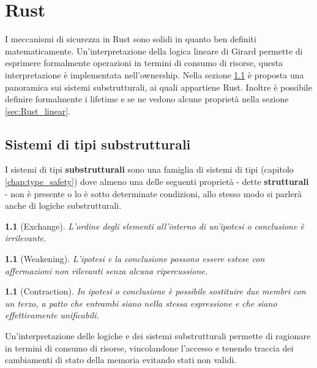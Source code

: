 \documentclass[Lau,binding=0.6cm]{sapthesis}
\newtheorem{lemma}[theorem]{}
\begin{document}




\chapter{Rust} \label{chap:Rust}
I meccanismi di sicurezza in Rust sono solidi in quanto ben definiti matematicamente.
Un'interpretazione della logica lineare di Girard permette di esprimere formalmente operazioni in termini di consumo di risorse, questa interpretazione è implementata nell'ownership.
Nella sezione \ref{sec:Rust_substruct} è proposta una panoramica sui sistemi substrutturali, ai quali appartiene Rust. 
Inoltre è possibile definire formalmente i lifetime e se ne vedono alcune proprietà nella sezione \ref{sec:Rust_linear}.

\section{Sistemi di tipi substrutturali} \label{sec:Rust_substruct}
I sistemi di tipi \textbf{substrutturali} sono una famiglia di sistemi di tipi (capitolo \ref{chap:type_safety}) dove almeno una delle seguenti proprietà - dette \textbf{strutturali} - non è presente o lo è sotto determinate condizioni, allo stesso modo si parlerà anche di logiche substrutturali.

\begin{lemma}[Exchange] \label{lemma:exchange}
    L'ordine degli elementi all'interno di un'ipotesi o conclusione è irrilevante.
\end{lemma}

\begin{lemma}[Weakening] \label{lemma:weakening}
    L'ipotesi e la conclusione possono essere estese con affermazioni non rilevanti senza alcuna ripercussione. 
\end{lemma}

\begin{lemma}[Contraction] \label{lemma:contraction}
    In ipotesi o conclusione è possibile sostituire due membri con un terzo, a patto che entrambi siano nella stessa espressione e che siano effettivamente unificabili.
\end{lemma}

Un'interpretazione delle logiche e dei sistemi substrutturali permette di ragionare in termini di consumo di risorse, vincolandone l'accesso e tenendo traccia dei cambiamenti di stato della memoria evitando stati non validi. 
\end{document}
